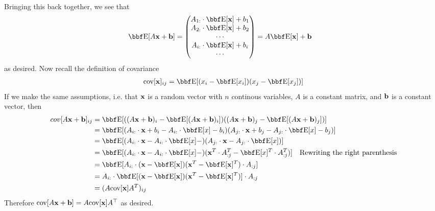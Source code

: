 \documentclass[12pt,letterpaper]{hmcpset}
\begin{document}
\begin{solution}
\begin{align*}
\end{align*}
Bringing this back together, we see that
\begin{align*}
    \EE[A\xx + \bb] &= \begin{pmatrix}A_{1:}\cdot \EE[\xx] + b_1 \\ A_{2:}\cdot \EE[\xx] + b_2 \\ \cdots \\ A_{i:}\cdot \EE[\xx] + b_i\\ \cdots \end{pmatrix} = A\EE[\xx] + \bb
\end{align*}
as desired. \newline \break 
Now recall the definition of covariance
\begin{align*}
    \textrm{cov}[\xx]_{ij} = \EE[(x_i - \EE[x_i])(x_j - \EE[x_j])]
\end{align*}
If we make the same assumptions, i.e. that ${\bf x}$ is a random vector with $n$ continous variables, $A$ is a constant matrix, and ${\bf b}$ is a constant vector, then
\begin{align*}
    cov[A\xx + \bb]_{ij} &= \EE[((A\xx + \bb)_i - \EE[(A\xx + \bb)_i])((A\xx + \bb)_j - \EE[(A\xx + \bb)_j])] \\
    &= \EE[(A_{i:}\cdot \xx + b_i - A_{i:}\cdot \EE[x] - b_i)(A_{j:}\cdot \xx + b_j - A_{j:}\cdot \EE[x] - b_j)] \\
    &= \EE[(A_{i:}\cdot \xx - A_{i:}\cdot \EE[x] - )(A_{j:}\cdot \xx  - A_{j:}\cdot \EE[x] )] \\
    &= \EE[(A_{i:}\cdot \xx - A_{i:}\cdot \EE[x] - )(\xx^T \cdot A^T_{:j} -  \EE[x]^T \cdot A^T_{:j} )] \quad \textrm{Rewriting the right parenthesis} \\
    &= \EE[A_{i:}\cdot(\xx - \EE[\xx])(\xx^T - \EE[\xx]^T)\cdot A_{:j}]\\
    &= A_{i:}\cdot\EE[(\xx - \EE[\xx])(\xx^T - \EE[\xx]^T)]\cdot A_{:j} \\
    &= (A \textrm{cov}[\xx]A^T)_{ij}
\end{align*}
Therefore ${\hbox{cov}}[A{\bf x} + {\bf b}] = A {\hbox{cov}}[{\bf x}] A^\top$ as desired.
\vfill

\end{solution}
\newpage
\end{document}
